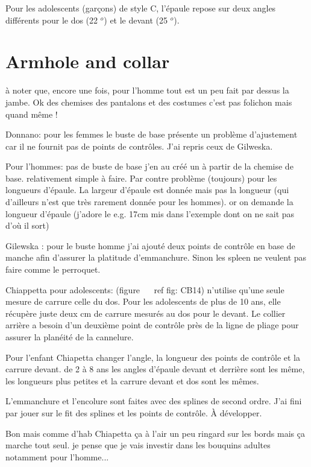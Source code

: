 \documentclass[10pt,a4paper,twoside]{report}
\begin{document}
Pour les adolescents (garçons) de style C, l'épaule repose sur deux angles différents pour le dos (22 $ ^ o $) et le devant (25 $ ^ o $).



\section{Armhole and collar}

à noter que, encore une fois, pour l'homme tout est un peu fait par dessus
la jambe. Ok des chemises des pantalons et des costumes c'est pas
folichon mais quand même !

Donnano:  pour les femmes le buste de base présente un problème d'ajustement car il ne
fournit pas de points de contrôles. J'ai repris ceux de Gilweska.

Pour l'hommes: pas de buste de base j'en au  créé un à partir de la chemise de base.
relativement simple à faire. Par contre problème (toujours) pour les
longueurs d'épaule. La largeur d'épaule est donnée mais pas la
longueur (qui d'ailleurs n'est que très rarement donnée pour les
hommes). or on demande la longueur d'épaule (j'adore le e.g. 17cm mis
dans l'exemple dont on ne sait pas d'où il sort)

Gilewska : pour le buste homme j'ai ajouté  deux points de contrôle
en base de manche  afin d'assurer la platitude d'emmanchure. Sinon les
spleen ne veulent pas faire comme le perroquet.


Chiappetta pour adolescents: (figure ~ \ ref {fig: CB14}) n'utilise qu'une seule mesure de carrure celle du dos. Pour les adolescents de plus de 10 ans, elle récupère juste deux cm de carrure mesurés au dos pour le devant. Le collier arrière a besoin d'un deuxième point de contrôle près de la ligne de pliage pour assurer la planéité de la cannelure.

Pour l'enfant Chiapetta changer l'angle, la longueur des points de contrôle et la carrure devant. de 2 à 8 ans les angles d'épaule devant et derrière sont les même, les longueurs plus petites et la carrure devant et dos sont les mêmes.

L'emmanchure et l'encolure sont faites avec des splines de second ordre. J'ai fini par jouer sur le fit des splines et les points de contrôle. À développer.

Bon mais comme d'hab Chiapetta ça à l'air un peu ringard sur les bords mais ça marche tout seul. je pense que je vais investir dans
les bouquins adultes notamment pour l'homme...
\end{document}
